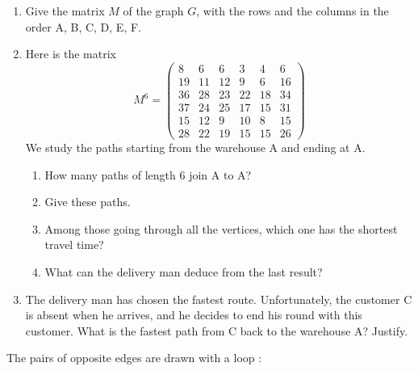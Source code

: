 \begin{enumerate}
\item Give the matrix $M$ of the graph $G$, with the rows and the columns
      in the order A, B, C, D, E, F.
\item Here is the matrix
\[M^6 =
\begin{pmatrix}
 8 &  6 &  6 &  3 &  4 &  6\\
19 & 11 & 12 &  9 &  6 & 16\\
36 & 28 & 23 & 22 & 18 & 34\\
37 & 24 & 25 & 17 & 15 & 31\\
15 & 12 &  9 & 10 &  8 & 15\\
28 & 22 & 19 & 15 & 15 & 26
\end{pmatrix}\]
We study the paths starting from the warehouse A and ending at A.
   \begin{enumerate}
   \item How many paths of length 6 join A to A?
   \item Give these paths.
   \item Among those going through all the vertices, which one has the
         shortest travel time?
   \item What can the delivery man deduce from the last result?
   \end{enumerate}
\item The delivery man has chosen the fastest route. Unfortunately, the
      customer C is absent when he arrives, and he decides to end his round
      with this customer. What is the fastest path from C back to the
      warehouse A? Justify.
\end{enumerate}

\newpage
The pairs of opposite edges are drawn with a loop :

\begin{tkzexample}
\end{tkzexample}

\newpage

